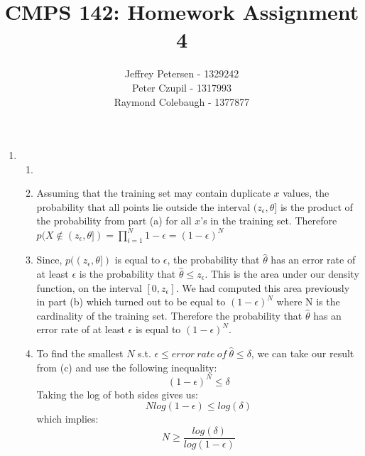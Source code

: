 \documentclass{article}
\title{CMPS 142: Homework Assignment 4}
\author{Jeffrey Petersen - 1329242\\Peter Czupil - 1317993\\Raymond Colebaugh - 1377877}
\begin{document}
\maketitle
\begin{enumerate}
        \item 
            \begin{enumerate}
                \item
                    \noindent{The probability that a point randomly drawn from $p$ is located somewhere in the interval $(z_{\epsilon}, \theta)$ is equal to $\epsilon$. Thus the probability that a point falls outside this interval is the complement of the previous probability. Therefore, $p((0, z_{\epsilon}]) = 1 - \epsilon$. }
                \item
                    Assuming that the training set may contain duplicate $x$ values, the probability that all points lie outside the interval $(z_{\epsilon}, \theta]$ is the product of the probability from part (a) for all $x$'s in the training set. Therefore $p(X \notin (z_{\epsilon}, \theta]) = \prod_{i = 1}^{N} 1 - \epsilon = (1 - \epsilon)^N$ 
                \item
                    Since, $p((z_{\epsilon}, \theta])$ is equal to $\epsilon$, the probability that ${\hat {\theta}}$ has an error rate of at least $\epsilon$ is the probability that ${\hat {\theta}} \leq z_{\epsilon}$. This is the area under our density function, on the interval $[0, z_{\epsilon}]$. We had computed this area previously in part (b) which turned out to be equal to $(1 - \epsilon)^N$ where N is the cardinality of the training set. Therefore the probability that ${\hat {\theta}}$ has an error rate of at least $\epsilon$ is equal to $(1 - \epsilon)^N$.
                \item
                 To find the smallest $N$ s.t. $\epsilon  \leq error\ rate\ of\ {\hat {\theta}} \leq \delta$, we can take our result from (c) and use the following inequality: 
$$ (1 - \epsilon)^N \leq \delta $$
Taking the log of both sides gives us:
$$Nlog(1 - \epsilon) \leq log(\delta)$$ 
which implies:
$$N \geq \frac{log(\delta)}{log(1 - \epsilon)}$$
            \end{enumerate}
\end{enumerate}
\end{document}
